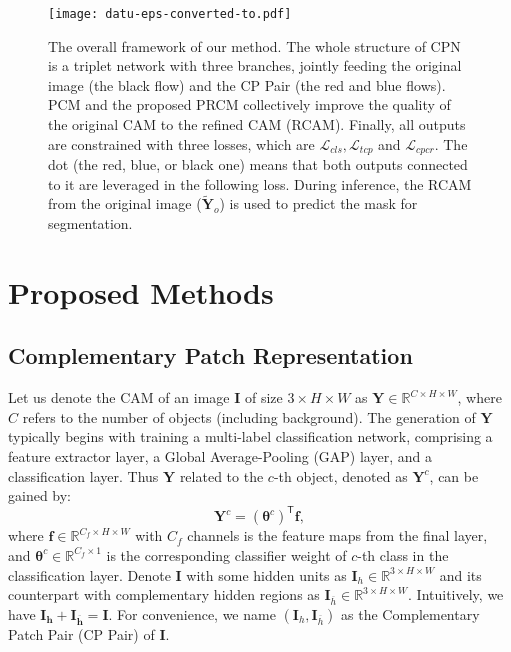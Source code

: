 \documentclass[10pt,twocolumn,letterpaper]{article}
\begin{document}
\begin{figure*}
\begin{center}
\texttt{[image: datu-eps-converted-to.pdf]}
\end{center}
\vspace{-4mm}
   \caption{The overall framework of our method. The whole structure of CPN is a triplet network with three branches, jointly feeding the original image (the black flow) and the CP Pair (the red and blue flows). PCM and the proposed PRCM collectively improve the quality of the original CAM to the refined CAM (RCAM). Finally, all outputs are constrained with three losses, which are $\mathcal {L}_{cls}, \mathcal {L}_{tcp}$ and $\mathcal {L}_{cpcr}$. The dot (the red, blue, or black one) means that both outputs connected to it are leveraged in the following loss. During inference, the RCAM from the original image ($\widetilde {\boldsymbol{Y}}_{o}$) is used to predict the mask for segmentation. }
\label{fig:datu}
\end{figure*}
\section{Proposed Methods}
\subsection{Complementary Patch Representation}\label{CPR}
Let us denote the CAM of an image $\boldsymbol{I}$ of size $3 \times H \times W$ as $\boldsymbol{Y} \in \mathbb{R}^{C \times H \times W}$, where $C$ refers to the number of objects (including background). The generation of $\boldsymbol{Y}$ typically begins with training a multi-label classification network, comprising a feature extractor layer, a Global Average-Pooling (GAP) layer, and a classification layer. Thus $\boldsymbol{Y}$ related to the $c$-th object, denoted as $\boldsymbol{Y}^{c}$, can be gained by:
\begin{equation}
\boldsymbol{Y}^{c}=({\boldsymbol{\theta}^{c}})^\mathsf {T}{\boldsymbol{f}},\label{eq1}
\end{equation}
where $\boldsymbol{f} \in \mathbb{R}^{C_f \times H \times W}$ with $C_f$ channels is the feature maps from the final layer, and $\boldsymbol{\theta}^{c} \in \mathbb{R}^{C_f \times 1}$ is the corresponding classifier weight of $c$-th class in the classification layer. Denote $\boldsymbol{I}$ with some hidden units as $\boldsymbol{I}_h \in \mathbb{R}^{3 \times H \times W}$ and its counterpart with complementary hidden regions as $\boldsymbol{I}_{\overline h} \in \mathbb{R}^{3 \times H \times W}$. Intuitively, we have $\boldsymbol{I_h} + \boldsymbol{I_{\overline h}}  = \boldsymbol{I}$. For convenience, we name $(\boldsymbol{I}_h, \boldsymbol{I}_{\overline h})$ as the Complementary Patch Pair (CP Pair) of $\boldsymbol{I}$.
\end{document}
